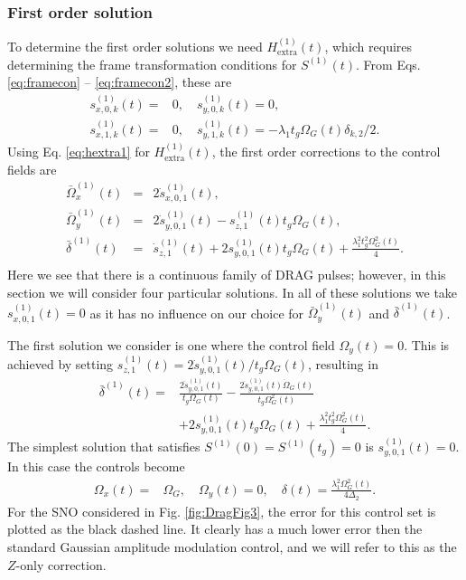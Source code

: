 \documentclass[pra,twocolumn,floatfix,superscriptaddress,eqsecnum]{revtex4-1}
\begin{document}
\subsubsection{First order solution}

To determine the first order solutions we need $H_\mathrm{extra}^{(1)}(t)$, which requires determining the frame transformation conditions for $S^{(1)}(t)$. From Eqs. \eqref{eq:framecon} -- \eqref{eq:framecon2}, these are
\begin{equation}
\begin{split}
  s^{(1)}_{x,0,k}(t) = &0,\quad s^{(1)}_{y,0,k}(t) =0,\\ s^{(1)}_{x,1,k}(t) = &0,\quad s^{(1)}_{y,1,k} (t)= -\lambda_1 t_g\Omega_{G}(t)\delta_{k,2}/2.
\end{split}
\end{equation}
 Using Eq. \eqref{eq:hextra1} for $H_\mathrm{extra}^{(1)}(t)$, the first order corrections to the control fields are
\begin{eqnarray}\label{eq:controlfeilds}
\bar\Omega_{x}^{(1)} (t) &=&  2\dot{s}^{(1)}_{x,0,1} (t) ,\\
 \bar\Omega_{y}^{(1)}(t) &=&   2 \dot{s}^{(1)}_{y,0,1} (t)-s^{(1)}_{z,1} (t)t_g\Omega_G (t),\\
  \bar\delta^{(1)} (t) &=&\dot{s}^{(1)}_{z,1}(t) + 2 s^{(1)}_{y,0,1}(t)t_g\Omega_G(t) + \frac{\lambda_1^2 t_g^2\Omega_G^2(t)}{4}.\nonumber\\
\end{eqnarray} 
Here we see that there is a continuous family of DRAG pulses; however, in this section we will consider four particular solutions. In all of these solutions we take ${s}^{(1)}_{x,0,1} (t)=0$ as it has no influence on our choice for $\bar\Omega_{y}^{(1)}(t)$ and $\bar\delta^{(1)} (t)$.

The first solution we consider is one where the control field $\Omega_{y}(t)=0$. This is achieved by setting $s^{(1)}_{z,1} (t)= 2 \dot{s}^{(1)}_{y,0,1} (t)/t_g\Omega_G (t)$, resulting in
\begin{equation}
\begin{split}
\bar\delta^{(1)} (t) = &\frac{2 \ddot{s}^{(1)}_{y,0,1} (t)}{t_g\Omega_G (t)} - \frac{2 \dot{s}^{(1)}_{y,0,1} (t)\dot\Omega_G (t)}{t_g\Omega_G^2 (t)}\\&+ 2 s^{(1)}_{y,0,1}(t)t_g\Omega_G(t) + \frac{\lambda_1^2 t_g^2\Omega_G^2(t)}{4}.
  \end{split}
\end{equation} The simplest solution that satisfies $S^{(1)}(0)=S^{(1)}(t_g)=0$ is $s^{(1)}_{y,0,1}(t)=0$. In this case the controls become
\begin{equation}
\begin{split}
\Omega_{x}(t) =&  \Omega_G ,\quad
\Omega_{y}(t) =  0, \quad
\delta(t) = \frac{\lambda_1^2 \Omega_G^2(t)}{4\Delta_2}.
  \end{split}
\end{equation} For the SNO considered in Fig. \ref{fig:DragFig3}, the error for this control set is plotted as the black dashed line. It clearly has a much lower error then the standard Gaussian amplitude modulation control, and we will refer to this as the $Z$-only correction.
\end{document}
